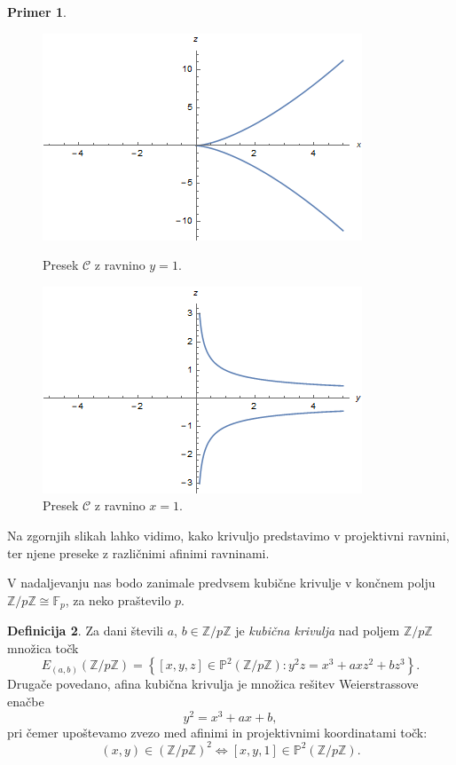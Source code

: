 \documentclass[12pt,a4paper,twoside]{article}
\theoremstyle{definition} %
\newtheorem{definicija}{Definicija}[section]
\newtheorem{primer}[definicija]{Primer}
\theoremstyle{plain} %
\numberwithin{equation}{section}  %
\newcommand{\Z}{\mathbb Z}
\newcommand{\Fq}[1]{{\mathbb{F}_{#1}}}
\newcommand{\PP}{\mathbb P}
\begin{document}
\begin{primer}
\begin{figure}[t]
\centering
\begin{minipage}{.45\textwidth}
\centering
\includegraphics[scale=0.5]{images/projektivnay.png}
\caption[Presek algebraične krivulje z ravnino $y=1$.]{Presek $\mathcal{C}$ z ravnino $y=1$.}
\label{fig:projektivnay}
\end{minipage}%
\hfill
\begin{minipage}{.45\textwidth}
\centering
\includegraphics[scale=0.5]{images/projektivnax.png}
\caption[Presek algebraične krivulje z ravnino $x=1$.]{Presek $\mathcal{C}$ z ravnino $x=1$.}
\label{fig:projektivnax}
\end{minipage}
\end{figure}
Na zgornjih slikah lahko vidimo, kako krivuljo predstavimo v projektivni ravnini, ter njene preseke z različnimi afinimi ravninami.

\end{primer}



V nadaljevanju nas bodo zanimale predvsem kubične krivulje v končnem polju $\mathbb{Z}/p\mathbb{Z} \cong \Fq{p}$, za neko praštevilo $p$.

\begin{definicija}
Za dani števili $a$, $b \in \mathbb{Z}/p\mathbb{Z}$ je \emph{kubična krivulja} nad poljem $\mathbb{Z}/p\mathbb{Z}$ množica točk
$$E_{(a,b)}(\mathbb{Z}/p\mathbb{Z}) =\left\{ [x,y,z] \in \PP^2(\mathbb{Z}/p\mathbb{Z}): y^2z=x^3+axz^2+bz^3 \right\} .$$
Drugače povedano, afina kubična krivulja je množica rešitev Weierstrassove enačbe
$$y^2=x^3+ax+b,$$
pri čemer upoštevamo zvezo med afinimi in projektivnimi koordinatami točk:
$$(x,y)\in (\Z/p\Z)^2 \Leftrightarrow [x,y,1]\in \PP^2(\Z/p\Z).$$

\end{definicija}
\end{document}
